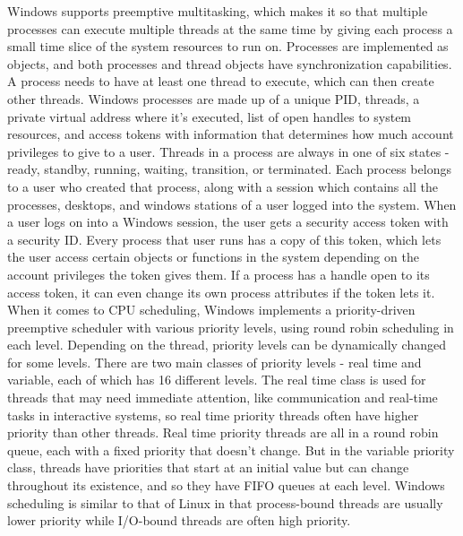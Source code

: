 \documentclass[10pt,draftclsnofoot,onecolumn,letterpaper]{IEEEtran}
\begin{document}
Windows supports preemptive multitasking, which makes it so that multiple processes can execute multiple threads at the same time by giving each process a small time slice of the system resources to run on\cite{4}. Processes are implemented as objects, and both processes and thread objects have synchronization capabilities\cite{3}. A process needs to have at least one thread to execute, which can then create other threads.
Windows processes are made up of a unique PID, threads, a private virtual address where it's executed, list of open handles to system resources, and access tokens with information that determines how much account privileges to give to a user. Threads in a process are always in one of six states - ready, standby, running, waiting, transition, or terminated\cite{3}.
Each process belongs to a user who created that process, along with a session which contains all the processes, desktops, and windows stations of a user logged into the system. When a user logs on into a Windows session, the user gets a security access token with a security ID. Every process that user runs has a copy of this token, which lets the user access certain objects or functions in the system depending on the account privileges the token gives them. If a process has a handle open to its access token, it can even change its own process attributes if the token lets it\cite{3}.
When it comes to CPU scheduling, Windows implements a priority-driven preemptive scheduler with various priority levels, using round robin scheduling in each level. Depending on the thread, priority levels can be dynamically changed for some levels. There are two main classes of priority levels - real time and variable, each of which has 16 different levels. The real time class is used for threads that may need immediate attention, like communication and real-time tasks in interactive systems, so real time priority threads often have higher priority than other threads\cite{3}.
Real time priority threads are all in a round robin queue, each with a fixed priority that doesn't change. But in the variable priority class, threads have priorities that start at an initial value but can change throughout its existence, and so they have FIFO queues at each level\cite{3}.
Windows scheduling is similar to that of Linux in that process-bound threads are usually lower priority while I/O-bound threads are often high priority.
\end{document}
